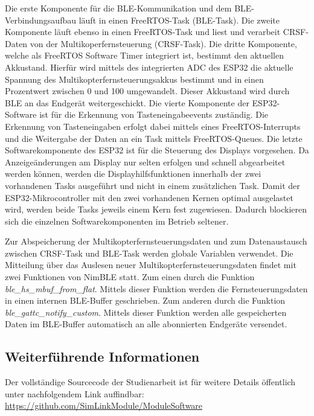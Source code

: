 Die erste Komponente für die \ac{BLE}-Kommunikation und dem \ac{BLE}-Verbindungsaufbau läuft in einen FreeRTOS-Task (\ac{BLE}-Task). Die zweite Komponente läuft ebenso in einen FreeRTOS-Task und liest und verarbeit CRSF-Daten von der Multikoperfernsteuerung (CRSF-Task). Die dritte Komponente, welche als FreeRTOS Software Timer integriert ist, bestimmt den aktuellen Akkustand. Hierfür wird mittels des integrierten \ac{ADC} des ESP32 die aktuelle Spannung des Multikopterfernsteuerungsakkus bestimmt und in einen Prozentwert zwischen 0 und 100 umgewandelt. Dieser Akkustand wird durch \ac{BLE} an das Endgerät weitergeschickt. Die vierte Komponente der ESP32-Software ist für die Erkennung von Tasteneingabeevents zuständig. Die Erkennung von Tasteneingaben erfolgt dabei mittels eines FreeRTOS-Interrupts und die Weitergabe der Daten an ein Task mittels FreeRTOS-Queues. Die letzte Softwarekomponente des ESP32 ist für die Steuerung des Displays vorgesehen. Da Anzeigeänderungen am Display nur selten erfolgen und schnell abgearbeitet werden können, werden die Displayhilfsfunktionen innerhalb der zwei vorhandenen Tasks ausgeführt und nicht in einem zusätzlichen Task. Damit der ESP32-Mikrocontroller mit den zwei vorhandenen Kernen optimal ausgelastet wird, werden beide Tasks jeweils einem Kern fest zugewiesen. Dadurch blockieren sich die einzelnen Softwarekomponenten im Betrieb seltener.

Zur Abspeicherung der Multikopterfernsteuerungsdaten und zum Datenaustausch zwischen CRSF-Task und \ac{BLE}-Task werden globale Variablen verwendet. Die Mitteilung über das Auslesen neuer Multikopterfernsteuerungsdaten findet mit zwei Funktionen von NimBLE statt. Zum einen durch die Funktion \textit{ble\_hs\_mbuf\_from\_flat}. Mittels dieser Funktion werden die Fernsteuerungsdaten in einen internen \ac{BLE}-Buffer geschrieben. Zum anderen durch die Funktion \textit{ble\_gattc\_notify\_custom}. Mittels dieser Funktion werden alle gespeicherten Daten im \ac{BLE}-Buffer automatisch an alle abonnierten Endgeräte versendet.

\subsection{Weiterführende Informationen}
Der vollständige Sourcecode der Studienarbeit ist für weitere Details öffentlich unter nachfolgendem Link auffindbar: \url{https://github.com/SimLinkModule/ModuleSoftware}

